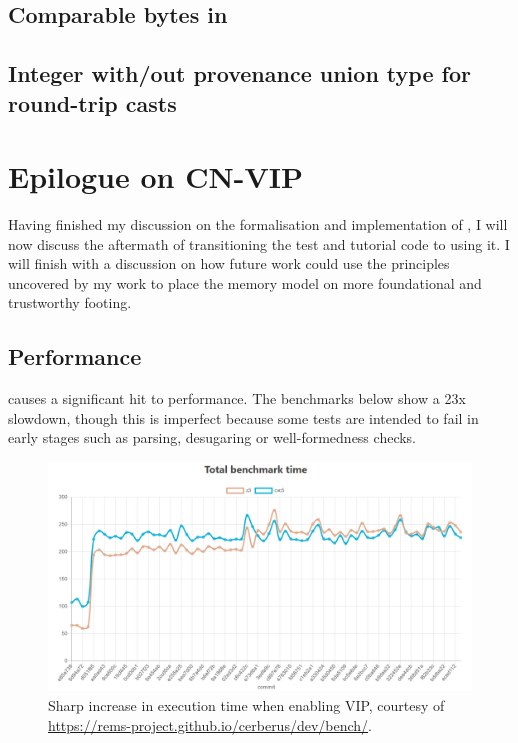 \section{Comparable bytes in }

\section{Integer with/out provenance union type for round-trip casts}

\chapter{Epilogue on CN-VIP}

Having finished my discussion on the formalisation and implementation of
, I will now discuss the aftermath of transitioning the  test
and tutorial code to using it. I will finish with a discussion on how future
work could use the principles uncovered by my work to place the  memory
model on more foundational and trustworthy footing.

\section{Performance}\label{sec:vip-perf}

 causes a significant hit to performance. The benchmarks below show
a 2\textendash{}3x slowdown, though this is imperfect because some tests are intended to
fail in early stages such as parsing, desugaring or well-formedness checks.

\begin{figure}[h]
    \centering
    \includegraphics[width=\textwidth]{../misc/vip-performance-hit.png}
    \caption{Sharp increase in execution time when enabling VIP, courtesy of
        \url{https://rems-project.github.io/cerberus/dev/bench/}.}\label{fig:vip-performance-hit2}
\end{figure}

